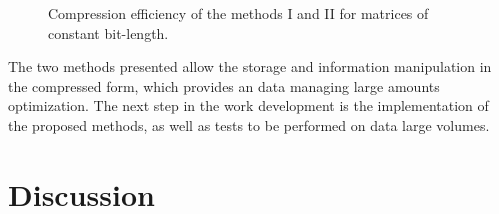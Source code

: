 \documentclass[10pt]{article}
\begin{document}
\begin{figure}[h]
  \caption{Compression efficiency of the methods I and II  for matrices of constant bit-length.}
  \label{fig:1819}
\end{figure}

The two methods presented allow the storage and information manipulation in the compressed form, which provides an data managing large amounts optimization. The next step in the work development is the implementation of the proposed methods, as well as tests to be performed on data large volumes.

\section*{Discussion}
\end{document}
